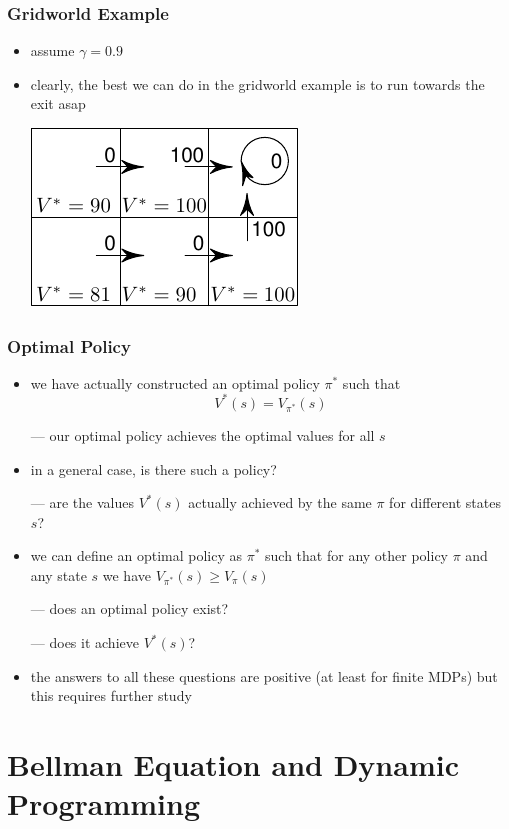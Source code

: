 \begin{frame}\frametitle{Gridworld Example}
\begin{itemize}

\item assume $\gamma = 0.9$

\item clearly, the best we can do in the gridworld example is to run
    towards the exit asap

\bigskip

\includegraphics[scale=1]{gridworld_optimal}



\end{itemize}
\end{frame}


\begin{frame}\frametitle{Optimal Policy}
\begin{itemize}

\item we have actually constructed an optimal policy $\pi^*$ such that
$$ V^*(s) = V_{\pi^*}(s)$$

--- our optimal policy achieves the optimal values for all $s$

\item in a general case, is there such a policy?

--- are the values $V^*(s)$ actually achieved by the same $\pi$ for
    different states $s$?

\item we can define an optimal policy as $\pi^*$ such that for any
other policy $\pi$ and any state $s$ we have $V_{\pi^*}(s)\ge
V_{\pi}(s)$

--- does an optimal policy exist?

--- does it achieve $V^*(s)$?

\item the answers to all these questions are positive (at least for
finite MDPs) but this requires further study

\end{itemize}
\end{frame}


\section[DP]{Bellman Equation and Dynamic Programming}













